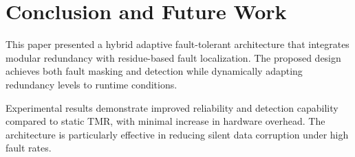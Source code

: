 \documentclass[conference]{IEEEtran}
\begin{document}
\section{Conclusion and Future Work}

This paper presented a hybrid adaptive fault-tolerant architecture that integrates modular redundancy with residue-based fault localization. 
The proposed design achieves both fault masking and detection while dynamically adapting redundancy levels to runtime conditions.

Experimental results demonstrate improved reliability and detection capability compared to static TMR, with minimal increase in hardware overhead. 
The architecture is particularly effective in reducing silent data corruption under high fault rates.
\end{document}
